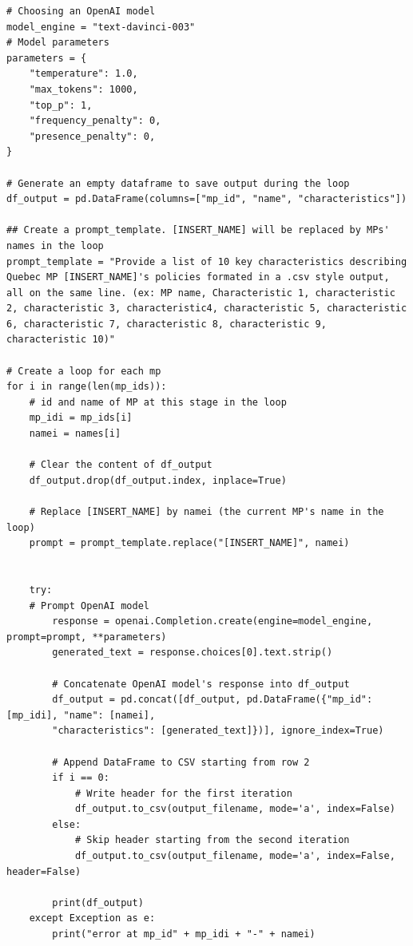 \documentclass{article}
\begin{document}
\begin{verbatim}
# Choosing an OpenAI model
model_engine = "text-davinci-003"
# Model parameters
parameters = {
    "temperature": 1.0,
    "max_tokens": 1000,
    "top_p": 1,
    "frequency_penalty": 0,
    "presence_penalty": 0,
}

# Generate an empty dataframe to save output during the loop
df_output = pd.DataFrame(columns=["mp_id", "name", "characteristics"])

## Create a prompt_template. [INSERT_NAME] will be replaced by MPs' names in the loop
prompt_template = "Provide a list of 10 key characteristics describing Quebec MP [INSERT_NAME]'s policies formated in a .csv style output, all on the same line. (ex: MP name, Characteristic 1, characteristic 2, characteristic 3, characteristic4, characteristic 5, characteristic 6, characteristic 7, characteristic 8, characteristic 9, characteristic 10)"

# Create a loop for each mp
for i in range(len(mp_ids)):
    # id and name of MP at this stage in the loop
    mp_idi = mp_ids[i]
    namei = names[i]
    
    # Clear the content of df_output
    df_output.drop(df_output.index, inplace=True)

    # Replace [INSERT_NAME] by namei (the current MP's name in the loop)
    prompt = prompt_template.replace("[INSERT_NAME]", namei)

    
    try:
    # Prompt OpenAI model
        response = openai.Completion.create(engine=model_engine, prompt=prompt, **parameters)
        generated_text = response.choices[0].text.strip()

        # Concatenate OpenAI model's response into df_output
        df_output = pd.concat([df_output, pd.DataFrame({"mp_id": [mp_idi], "name": [namei],
        "characteristics": [generated_text]})], ignore_index=True)

        # Append DataFrame to CSV starting from row 2
        if i == 0:
            # Write header for the first iteration
            df_output.to_csv(output_filename, mode='a', index=False)
        else:
            # Skip header starting from the second iteration
            df_output.to_csv(output_filename, mode='a', index=False, header=False)

        print(df_output)
    except Exception as e:
        print("error at mp_id" + mp_idi + "-" + namei)
\end{verbatim}
\end{document}
